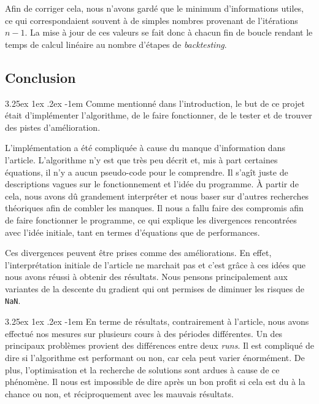\documentclass[a4paper, 11pt]{article}
\makeatletter
\renewcommand\paragraph{\@startsection{paragraph}{5}{\z@}%
  {3.25ex \@plus1ex \@minus.2ex}%
  {-1em}%
  {\normalfont\normalsize\bfseries}}
\makeatother
\begin{document}
Afin de corriger cela, nous n'avons gardé que le minimum d'informations utiles, ce qui correspondaient souvent à de simples nombres provenant de l'itérations $n-1$. La mise à jour de ces valeurs se fait donc à chacun fin de boucle rendant le temps de calcul linéaire au nombre d'étapes de \textit{backtesting}.
 
\subsection{Conclusion}
\paragraph{}
Comme mentionné dans l'introduction, le but de ce projet était d'implémenter l'algorithme, de le faire fonctionner, de le tester et de trouver des pistes
d'amélioration.

L'implémentation a été compliquée à cause du manque d'information dans l'article. L'algorithme n'y est que très peu décrit et, mis à part certaines 
équations, il n'y a aucun pseudo-code pour le comprendre. Il s'agît juste de descriptions vagues sur le fonctionnement et l'idée du programme. À partir de
cela, nous avons dû grandement interpréter et nous baser sur d'autres recherches théoriques afin de combler les manques. Il nous a fallu faire des compromis
afin de faire fonctionner le programme, ce qui explique les divergences rencontrées avec l'idée initiale, tant en termes d'équations que de performances.

Ces divergences peuvent être prises comme des améliorations. En effet, l'interprétation initiale de l'article ne marchait pas et c'est grâce à ces idées que nous avons
réussi à obtenir des résultats. Nous pensons principalement aux variantes de la descente du gradient qui ont permises de diminuer les risques de
\texttt{NaN}.

\paragraph{}
En terme de résultats, contrairement à l'article, nous avons effectué nos mesures sur plusieurs cours à des périodes différentes. Un des principaux problèmes
provient des différences entre deux \textit{runs}. Il est compliqué de dire si l'algorithme est performant ou non, car cela peut varier énormément. De plus,
l'optimisation et la recherche de solutions sont ardues à cause de ce phénomène. Il nous est impossible de dire après un bon profit si cela est du à la
chance ou non, et réciproquement avec les mauvais résultats.
\end{document}
